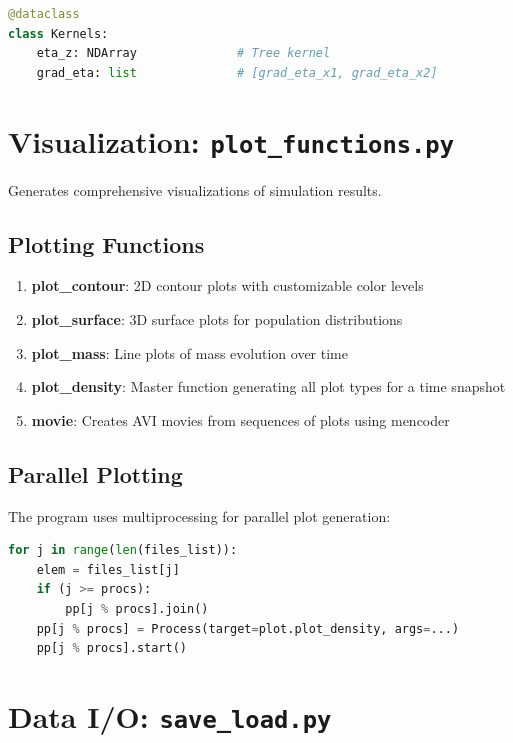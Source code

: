 \documentclass[12pt,a4paper]{report}
\begin{document}
\begin{lstlisting}[language=Python]
@dataclass
class Kernels:
    eta_z: NDArray              # Tree kernel
    grad_eta: list              # [grad_eta_x1, grad_eta_x2]
\end{lstlisting}

\section{Visualization: \texttt{plot\_functions.py}}

Generates comprehensive visualizations of simulation results.

\subsection{Plotting Functions}

\begin{enumerate}
    \item \textbf{plot\_contour}: 2D contour plots with customizable color levels
    \item \textbf{plot\_surface}: 3D surface plots for population distributions
    \item \textbf{plot\_mass}: Line plots of mass evolution over time
    \item \textbf{plot\_density}: Master function generating all plot types for a time snapshot
    \item \textbf{movie}: Creates AVI movies from sequences of plots using mencoder
\end{enumerate}

\subsection{Parallel Plotting}

The program uses multiprocessing for parallel plot generation:

\begin{lstlisting}[language=Python]
for j in range(len(files_list)):
    elem = files_list[j]
    if (j >= procs):
        pp[j % procs].join()
    pp[j % procs] = Process(target=plot.plot_density, args=...)
    pp[j % procs].start()
\end{lstlisting}

\section{Data I/O: \texttt{save\_load.py}}
\end{document}
